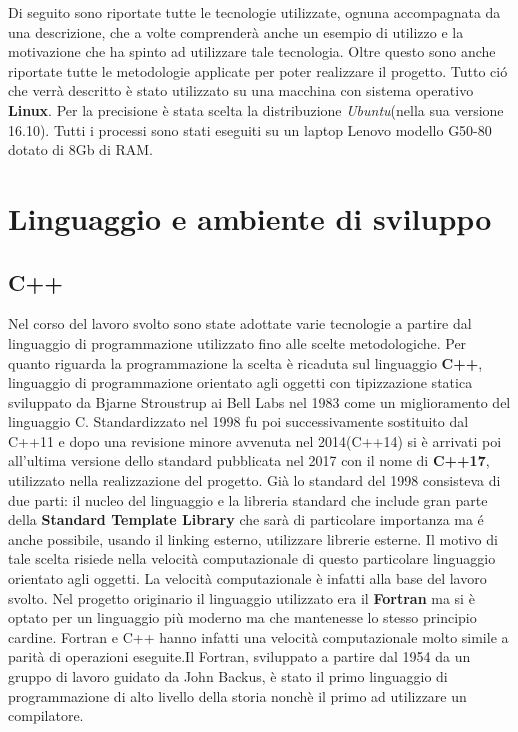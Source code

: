 \large{
Di seguito sono riportate tutte le tecnologie utilizzate, ognuna accompagnata da una descrizione, che a volte comprender\`a anche un esempio di utilizzo e la motivazione che ha spinto ad utilizzare tale tecnologia. Oltre questo sono anche riportate tutte le metodologie applicate per poter realizzare il progetto. Tutto ci\'o che verr\`a descritto \`e stato utilizzato su una macchina con sistema operativo \textbf{Linux}. Per la precisione \`e stata scelta la distribuzione \textit{Ubuntu}(nella sua versione 16.10). Tutti i processi sono stati eseguiti su un laptop Lenovo modello G50-80 dotato di 8Gb di RAM.

\section{Linguaggio e ambiente di sviluppo}
\subsection{C++}
Nel corso del lavoro svolto sono state adottate varie tecnologie a partire dal linguaggio di programmazione utilizzato fino alle scelte metodologiche. Per quanto riguarda la programmazione la scelta \`e ricaduta sul linguaggio \textbf{C++},
linguaggio di programmazione orientato agli oggetti con tipizzazione statica sviluppato da Bjarne Stroustrup ai Bell Labs nel 1983 come un miglioramento del linguaggio C. Standardizzato nel 1998 fu poi successivamente sostituito dal C++11 e dopo una revisione minore avvenuta nel 2014(C++14) si \`e arrivati poi all'ultima versione dello standard pubblicata nel 2017 con il nome di \textbf{C++17}, utilizzato nella realizzazione del progetto.
Gi\`a lo standard del 1998 consisteva di due parti: il nucleo del linguaggio e la libreria standard che include gran parte della \textbf{Standard Template Library} che sar\`a di particolare importanza ma \'e anche  possibile, usando il linking esterno, utilizzare librerie esterne.
Il motivo di tale scelta risiede nella velocit\`a computazionale di questo particolare linguaggio orientato agli oggetti. La velocit\`a computazionale \`e infatti alla base del lavoro svolto. Nel progetto originario il linguaggio utilizzato era il \textbf{Fortran} ma si \`e optato per un linguaggio pi\`u moderno ma che mantenesse lo stesso principio cardine. Fortran e C++ hanno infatti una velocit\`a computazionale molto simile a parit\`a di operazioni eseguite.Il Fortran, sviluppato a partire dal 1954 da un gruppo di lavoro guidato da John Backus, \`e stato il primo linguaggio di programmazione di alto livello della storia nonch\`e il primo ad utilizzare un compilatore.
}
